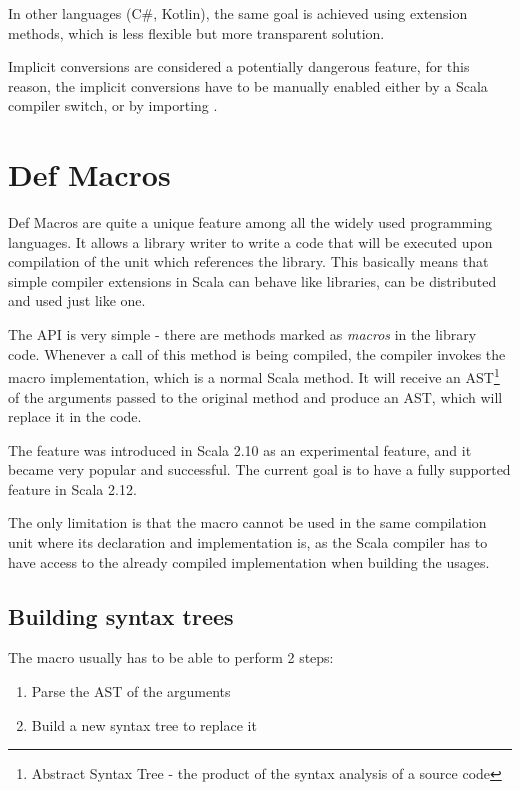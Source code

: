 In other languages (C\#, Kotlin), the same goal is achieved using extension methods, which is less flexible but more transparent solution.

Implicit conversions are considered a potentially dangerous feature, for this reason, the implicit conversions have to be manually enabled either by a Scala compiler switch, or by importing .

\section{Def Macros}
\label{sec:defmacros}

Def Macros are quite a unique feature among all the widely used programming languages. It allows a library writer to write a code that will be executed upon compilation of the unit which references the library. This basically means that simple compiler extensions in Scala can behave like libraries, can be distributed and used just like one.

The API is very simple - there are methods marked as \textit{macros} in the library code. Whenever a call of this method is being compiled, the compiler invokes the macro implementation, which is a normal Scala method. It will receive an AST\footnote{Abstract Syntax Tree - the product of the syntax analysis of a source code} of the arguments passed to the original method and produce an AST, which will replace it in the code.

The feature was introduced in Scala 2.10 as an experimental feature, and it became very popular and successful. The current goal is to have a fully supported feature in Scala 2.12.


The only limitation is that the macro cannot be used in the same compilation unit where its declaration and implementation is, as the Scala compiler has to have access to the already compiled implementation when building the usages.

\subsection{Building syntax trees}
\label{subsec:buildingast}

The macro usually has to be able to perform 2 steps:

\begin{enumerate}
	\item Parse the AST of the arguments
	\item Build a new syntax tree to replace it
\end{enumerate}

